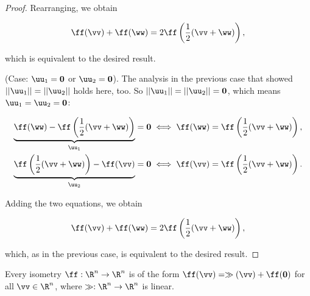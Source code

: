 \begin{proof}
	Rearranging, we obtain
	
	\begin{align*}
		\ff(\vv) + \ff(\ww) = 2\ff\left(\frac{1}{2}(\vv + \ww)\right),
	\end{align*}
	
	which is equivalent to the desired result.
	
	(Case: $\uu_1 = \mathbf{0}$ or $\uu_2 = \mathbf{0}$). The analysis in the previous case that showed $||\uu_1|| = ||\uu_2||$ holds here, too. So $||\uu_1|| = ||\uu_2|| = \mathbf{0}$, which means $\uu_1 = \uu_2 = \mathbf{0}$:
	
	\begin{align*}
		\underbrace{\ff(\ww) - \ff\left( \frac{1}{2}(\vv + \ww)\right)}_{\uu_1} &= \mathbf{0} \iff \ff(\ww) = \ff\left( \frac{1}{2}(\vv + \ww) \right), \\
		\underbrace{\ff\left(\frac{1}{2}(\vv + \ww)\right) - \ff(\vv)}_{\uu_2} &= \mathbf{0} \iff \ff(\vv) = \ff\left( \frac{1}{2}(\vv + \ww) \right).
	\end{align*}
	
	Adding the two equations, we obtain
	
	\begin{align*}
		\ff(\vv) + \ff(\ww) = 2\ff\left(\frac{1}{2}(\vv + \ww)\right),
	\end{align*}
	
	which, as in the previous case, is equivalent to the desired result.
\end{proof}

\begin{theorem}
	\label{ch::lin_alg::thm::isometries_are_affine}
	
	Every isometry $\ff:\R^n \rightarrow \R^n$ is of the form $\ff(\vv) = \gg(\vv) + \ff(\mathbf{0})$ for all $\vv \in \R^n$, where $\gg:\R^n \rightarrow \R^n$ is linear.
\end{theorem}

